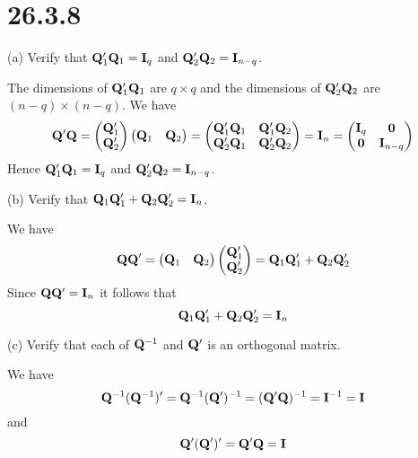 \section*{26.3.8}
(a) Verify that ${\bf Q}'_1{\bf Q}_1={\bf I}_q$ and
${\bf Q}'_2{\bf Q}_2={\bf I}_{n-q}$.

\bigskip
\noindent
The dimensions of ${\bf Q}'_1{\bf Q}_1$ are $q\times q$ and the
dimensions of ${\bf Q}'_2{\bf Q}_2$ are $(n-q)\times(n-q)$.
We have
$${\bf Q}'{\bf Q}=\left(\begin{matrix}
{\bf Q}'_1\cr
{\bf Q}'_2
\end{matrix}\right)\left(\begin{matrix}
{\bf Q}_1 & {\bf Q}_2\end{matrix}\right)=\left(\begin{matrix}
{\bf Q}'_1{\bf Q}_1 & {\bf Q}'_1{\bf Q}_2\cr
{\bf Q}'_2{\bf Q}_1 & {\bf Q}'_2{\bf Q}_2
\end{matrix}\right)={\bf I}_n=\left(\begin{matrix}
{\bf I}_q & {\bf 0}\cr
{\bf 0} & {\bf I}_{n-q}
\end{matrix}\right)
$$
Hence 
${\bf Q}'_1{\bf Q}_1={\bf I}_q$ and
${\bf Q}'_2{\bf Q}_2={\bf I}_{n-q}$.

\bigskip
\noindent
(b) Verify that ${\bf Q}_1{\bf Q}'_1+{\bf Q}_2{\bf Q}'_2={\bf I}_n$.

\bigskip
\noindent
We have
$$
{\bf Q}{\bf Q}'
=
\left(\begin{matrix}
{\bf Q}_1 & {\bf Q}_2
\end{matrix}\right)
%
\left(\begin{matrix}
{\bf Q}'_1\cr
{\bf Q}'_2
\end{matrix}\right)
={\bf Q}_1{\bf Q}'_1+{\bf Q}_2{\bf Q}'_2
$$
Since ${\bf Q}{\bf Q}'={\bf I}_n$ it follows that
$${\bf Q}_1{\bf Q}'_1+{\bf Q}_2{\bf Q}'_2={\bf I}_n$$

\bigskip
\noindent
(c) Verify that each of ${\bf Q}^{-1}$ and ${\bf Q}'$ is an
orthogonal matrix.

\bigskip
\noindent
We have
$${\bf Q}^{-1}({\bf Q}^{-1})'={\bf Q}^{-1}({\bf Q}')^{-1}
=({\bf Q}'{\bf Q})^{-1}={\bf I}^{-1}={\bf I}$$
and
$${\bf Q}'({\bf Q}')'={\bf Q}'{\bf Q}={\bf I}$$
